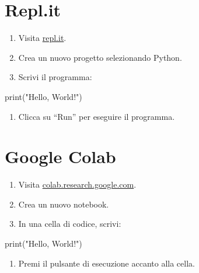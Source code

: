 \documentclass[
  letterpaper,
]{scrbook}
\newenvironment{Shaded}{\begin{snugshade}}{\end{snugshade}}
\newcommand{\BuiltInTok}[1]{\textcolor[rgb]{0.00,0.23,0.31}{#1}}
\newcommand{\NormalTok}[1]{\textcolor[rgb]{0.00,0.23,0.31}{#1}}
\newcommand{\StringTok}[1]{\textcolor[rgb]{0.13,0.47,0.30}{#1}}
\providecommand{\tightlist}{%
  \setlength{\itemsep}{0pt}\setlength{\parskip}{0pt}}\usepackage{longtable,booktabs,array}
\begin{document}
\section{Repl.it}

\begin{enumerate}
\def\labelenumi{\arabic{enumi}.}
\item
  Visita \href{https://repl.it/}{repl.it}.
\item
  Crea un nuovo progetto selezionando Python.
\item
  Scrivi il programma:
\end{enumerate}

\begin{Shaded}
\begin{Highlighting}[]
\BuiltInTok{print}\NormalTok{(}\StringTok{"Hello, World!"}\NormalTok{)}
\end{Highlighting}
\end{Shaded}

\begin{enumerate}
\def\labelenumi{\arabic{enumi}.}
\setcounter{enumi}{3}
\tightlist
\item
  Clicca su ``Run'' per eseguire il programma.
\end{enumerate}

\section{Google Colab}

\begin{enumerate}
\def\labelenumi{\arabic{enumi}.}
\item
  Visita
  \href{https://colab.research.google.com/}{colab.research.google.com}.
\item
  Crea un nuovo notebook.
\item
  In una cella di codice, scrivi:
\end{enumerate}

\begin{Shaded}
\begin{Highlighting}[]
\BuiltInTok{print}\NormalTok{(}\StringTok{"Hello, World!"}\NormalTok{)}
\end{Highlighting}
\end{Shaded}

\begin{enumerate}
\def\labelenumi{\arabic{enumi}.}
\setcounter{enumi}{3}
\tightlist
\item
  Premi il pulsante di esecuzione accanto alla cella.
\end{enumerate}
\end{document}
